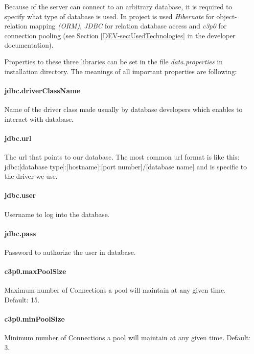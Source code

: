 
Because of the server can connect to an arbitrary database, it is required to
specify what type of database is used. In \textan{} project is used \emph{Hibernate}
for object-relation mapping \emph{(ORM)}, \emph{JDBC} for relation database access
and \emph{c3p0} for connection pooling (see Section
\ref{DEV-sec:UsedTechnologies} in the developer documentation).

Properties to these three libraries can be set in the file \emph{data.properties}
in installation directory. The meanings of all important properties are following:

\paragraph{jdbc.driverClassName}
Name of the driver class made usually by database developers which enables to
interact with database.

\paragraph{jdbc.url}
 The url that points to our database. The most common url format is like this:
jdbc:[database type]:[hostname]:[port number]/[database name]
and is specific to the driver we use.

\paragraph{jdbc.user}
Username to log into the database.
\paragraph{jdbc.pass}
Password to authorize the user in database.

\paragraph{c3p0.maxPoolSize}
Maximum number of Connections a pool will maintain at any given time.
Default: 15.

\paragraph{c3p0.minPoolSize}
Minimum number of Connections a pool will maintain at any given time.
Default: 3.

